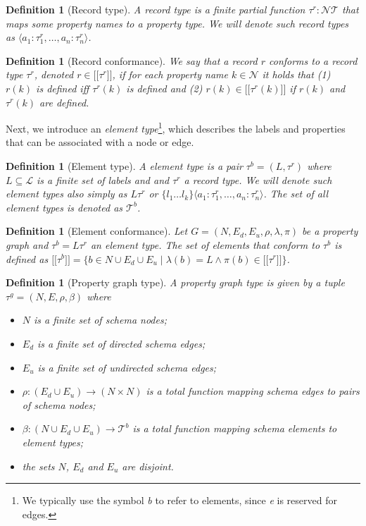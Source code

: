 \documentclass[a4paper]{article}
\makeatletter
\newtheorem{definition}[theorem]{Definition}
\newcommand{\ptypes}{\mathcal{T}}
\newcommand{\rtype}{\tau^r}
\newcommand{\btype}{\tau^b}
\newcommand{\btypes}{\mathcal{T}^b}
\newcommand{\gtype}{\tau^g}
\newcommand{\lsem}{\ensuremath{[\![}}
\newcommand{\rsem}{\ensuremath{]\!]}}
\newcommand{\sem}[1]{\ensuremath{\lsem #1 \rsem}}
\newcommand{\pto}{}%
\DeclareRobustCommand{\pto}{\mathrel{\mathpalette\p@to@gets\to}}
\newcommand{\p@to@gets}[2]{%
  \ooalign{\hidewidth$\m@th#1\mapstochar\mkern5mu$\hidewidth\cr$\m@th#1\to$\cr}%
}
\makeatother
\begin{document}
\begin{definition}[Record type]
  A \emph{record type} is a finite partial function $\rtype : \mathcal{N} \pto \ptypes$ that maps some property names to a property type. We will denote such record types as $\langle a_1 : \rtype_1, \ldots, a_n : \rtype_n \rangle$.
\end{definition}

\begin{definition}[Record conformance]
  We say that a record $r$ \emph{conforms} to a record type $\rtype$, denoted $r \in \sem{\rtype}$, if for each property name $k \in \mathcal{N}$ it holds that (1) $r(k)$ is defined iff $\rtype(k)$ is defined and (2) $r(k) \in \sem{\rtype(k)}$ if $r(k)$ and $\rtype(k)$ are defined.
\end{definition}

Next, we introduce an \emph{element type}\footnote{We typically use the symbol \emph{b} to refer to elements, since \emph{e} is reserved for edges.}, which describes the labels and properties that can be associated with a node or edge.

\begin{definition}[Element type]
  A \emph{element type} is a pair $\btype = (L, \rtype)$ where $L \subseteq \mathcal{L}$ is a finite set of labels and and $\rtype$ a record type. We will denote such element types also simply as $L\rtype$ or $\{ l_1 \ldots l_k \} \langle a_1 : \rtype_1, \ldots, a_n : \rtype_n \rangle$. The set of all element types is denoted as $\btypes$.
\end{definition}

\begin{definition}[Element conformance]
  Let $G = (N, E_d, E_u, \rho, \lambda, \pi)$ be a property graph and $\btype = L\rtype$ an element type. The set of elements that \emph{conform} to $\btype$ is defined as $\sem{\btype} = \{b \in N \cup E_d \cup E_u \mid \lambda(b) = L \wedge \pi(b) \in \sem{\rtype}\}$.
\end{definition}

\begin{definition}[Property graph type]
  A \emph{property graph type} is given by a tuple $\gtype = (N, E, \rho, \beta)$ where 
  \begin{itemize}
    \item $N$ is a finite set of schema nodes;
    \item $E_d$ is a finite set of directed schema edges;
    \item $E_u$ is a finite set of undirected schema edges;
    \item $\rho : (E_d \cup E_u) \to (N \times N)$ is a total function mapping schema edges to pairs of schema nodes;
    \item $\beta : (N \cup E_d \cup E_u) \to \btypes$ is a total function mapping schema elements to element types;
    \item the sets $N$, $E_d$ and $E_u$ are disjoint.
  \end{itemize}
\end{definition}
\end{document}
